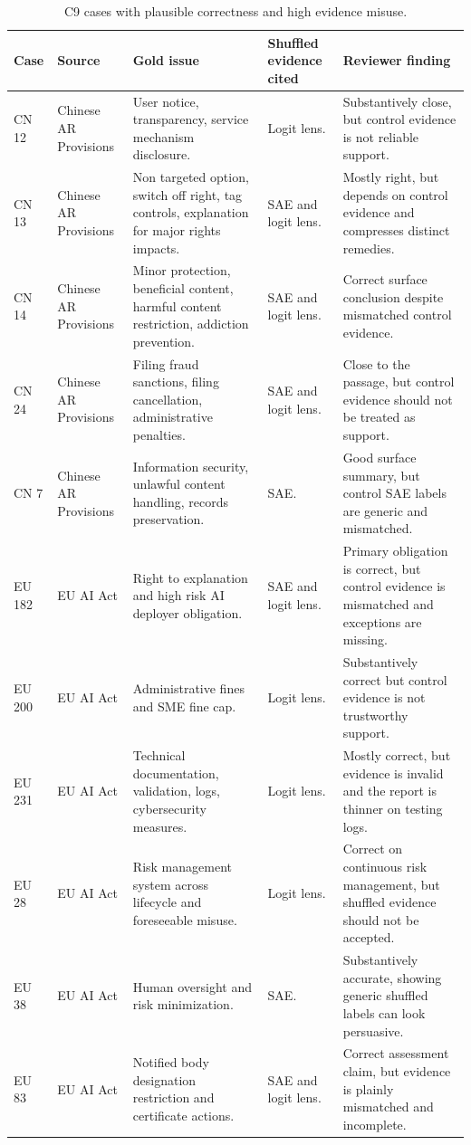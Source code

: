\documentclass{article}
\begin{document}
\begin{table}[h]
    \centering
    \caption{C9 cases with plausible correctness and high evidence misuse.}
    \label{tab:appendix-c9-failures}
    \scriptsize
    \begin{tabular}{@{}p{}p{}p{}p{}p{}@{}}
        \toprule
        Case & Source & Gold issue & Shuffled evidence cited & Reviewer finding \\
        \midrule
        CN 12 & Chinese AR Provisions & User notice, transparency, service mechanism disclosure. & Logit lens. & Substantively close, but control evidence is not reliable support. \\
        CN 13 & Chinese AR Provisions & Non targeted option, switch off right, tag controls, explanation for major rights impacts. & SAE and logit lens. & Mostly right, but depends on control evidence and compresses distinct remedies. \\
        CN 14 & Chinese AR Provisions & Minor protection, beneficial content, harmful content restriction, addiction prevention. & SAE and logit lens. & Correct surface conclusion despite mismatched control evidence. \\
        CN 24 & Chinese AR Provisions & Filing fraud sanctions, filing cancellation, administrative penalties. & SAE and logit lens. & Close to the passage, but control evidence should not be treated as support. \\
        CN 7 & Chinese AR Provisions & Information security, unlawful content handling, records preservation. & SAE. & Good surface summary, but control SAE labels are generic and mismatched. \\
        EU 182 & EU AI Act & Right to explanation and high risk AI deployer obligation. & SAE and logit lens. & Primary obligation is correct, but control evidence is mismatched and exceptions are missing. \\
        EU 200 & EU AI Act & Administrative fines and SME fine cap. & Logit lens. & Substantively correct but control evidence is not trustworthy support. \\
        EU 231 & EU AI Act & Technical documentation, validation, logs, cybersecurity measures. & Logit lens. & Mostly correct, but evidence is invalid and the report is thinner on testing logs. \\
        EU 28 & EU AI Act & Risk management system across lifecycle and foreseeable misuse. & Logit lens. & Correct on continuous risk management, but shuffled evidence should not be accepted. \\
        EU 38 & EU AI Act & Human oversight and risk minimization. & SAE. & Substantively accurate, showing generic shuffled labels can look persuasive. \\
        EU 83 & EU AI Act & Notified body designation restriction and certificate actions. & SAE and logit lens. & Correct assessment claim, but evidence is plainly mismatched and incomplete. \\
        \bottomrule
    \end{tabular}
\end{table}
\end{document}
